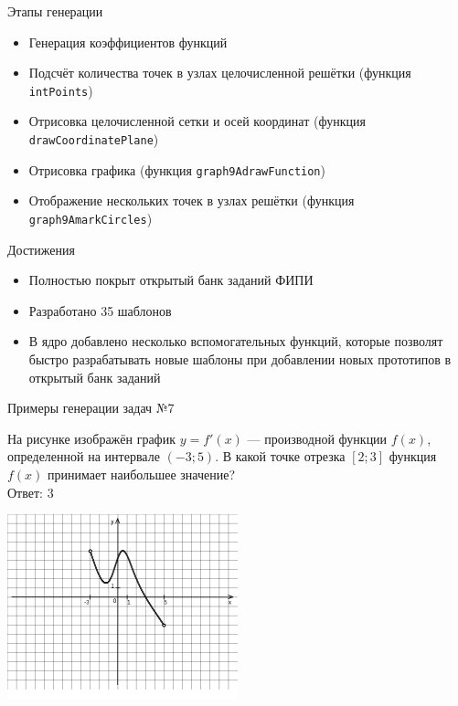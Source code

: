 \documentclass[aspectratio=169]{beamer}
\begin{document}
\begin{frame}{Этапы генерации}
    \begin{itemize}
        \item Генерация коэффициентов функций
        \item Подсчёт количества точек в узлах целочисленной решётки (функция \texttt{intPoints})
        \item Отрисовка целочисленной сетки и осей координат (функция \texttt{drawCoordinatePlane})
        \item Отрисовка графика (функция \texttt{graph9AdrawFunction})
        \item Отображение нескольких точек в узлах решётки (функция \texttt{graph9AmarkCircles})
    \end{itemize}
    
\end{frame}

\begin{frame}{Достижения}
    \begin{itemize}
        \item Полностью покрыт открытый банк заданий ФИПИ
        \item Разработано 35 шаблонов
        \item В ядро добавлено несколько вспомогательных функций, которые позволят быстро разрабатывать новые шаблоны при добавлении новых прототипов в открытый банк заданий
    \end{itemize}
    
\end{frame}

\begin{frame}{Примеры генерации задач №7}
    
    \begin{multicols}{2}
        На рисунке изображён график $y=f'(x)$ — производной функции $f(x)$, определенной на интервале $(-3;5)$. В какой точке отрезка $[2; 3]$ функция $f(x)$ принимает наибольшее значение?\\

        Ответ: $3$

        \includegraphics[width=0.5\textwidth]{images/9299084059373277n0}
    \end{multicols}
          
\end{frame}
\end{document}
